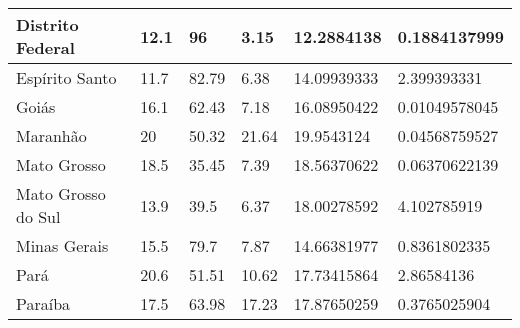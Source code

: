 \begin{table}[h]
{\begin{tabular}{|l|l|l|l|l|l|}
Distrito Federal    & 12.1                                              & 96                                      & 3.15                                       & 12.2884138                                         & 0.1884137999              \\ \hline
Espírito Santo      & 11.7                                              & 82.79                                   & 6.38                                       & 14.09939333                                        & 2.399393331               \\ \hline
Goiás               & 16.1                                              & 62.43                                   & 7.18                                       & 16.08950422                                        & 0.01049578045             \\ \hline
Maranhão            & 20                                                & 50.32                                   & 21.64                                      & 19.9543124                                         & 0.04568759527             \\ \hline
Mato Grosso         & 18.5                                              & 35.45                                   & 7.39                                       & 18.56370622                                        & 0.06370622139             \\ \hline
Mato Grosso do Sul  & 13.9                                              & 39.5                                    & 6.37                                       & 18.00278592                                        & 4.102785919               \\ \hline
Minas Gerais        & 15.5                                              & 79.7                                    & 7.87                                       & 14.66381977                                        & 0.8361802335              \\ \hline
Pará                & 20.6                                              & 51.51                                   & 10.62                                      & 17.73415864                                        & 2.86584136                \\ \hline
Paraíba             & 17.5                                              & 63.98                                   & 17.23                                      & 17.87650259                                        & 0.3765025904              \\ \hline

\end{tabular}}
\end{table}
